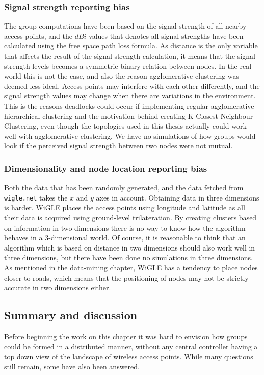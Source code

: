 \subsubsection{Signal strength reporting bias}
The group computations have been based on the signal strength of all nearby access points, and the $dBi$ values that denotes all signal strengths have been calculated using the
free space path loss formula. As distance is the only variable that affects the result of the signal strength calculation,
it means that the signal strength levels becomes a symmetric binary relation between nodes. In the real world this is not the case, and also the reason agglomerative clustering was deemed
less ideal. Access points may interfere with each other differently, and the signal strength values may change when there are variations in the environment. This is the reasons deadlocks could
occur if implementing regular agglomerative hierarchical clustering and the motivation behind creating K-Closest Neighbour Clustering, even though the topologies used in this thesis actually
could work well with agglomerative clustering. We have no simulations of how groups would look if the perceived signal strength between two nodes were not mutual.

\subsubsection{Dimensionality and node location reporting bias} 
Both the data that has been randomly generated, and the data fetched from \verb|wigle.net| takes the $x$ and $y$ axes in account. Obtaining data in three dimensions is harder.
WiGLE places the access points using longitude and latitude as all their data is acquired using ground-level trilateration. 
By creating clusters based on information in two dimensions there is no way to know how the algorithm behaves in a 3-dimensional world. Of course, it is reasonable to think that an algorithm
which is based on distance in two dimensions should also work well in three dimensions, but there have been done no simulations in three dimensions.
As mentioned in the data-mining chapter, WiGLE has a tendency to place nodes closer to roads, which means that the positioning of nodes may not be strictly accurate in two dimensions either.  


\subsection{Summary and discussion}
Before beginning the work on this chapter it was hard to envision how groups could be formed in a distributed manner, without any central controller having a top down view of
the landscape of wireless access points. While many questions still remain, some have also been answered. 


